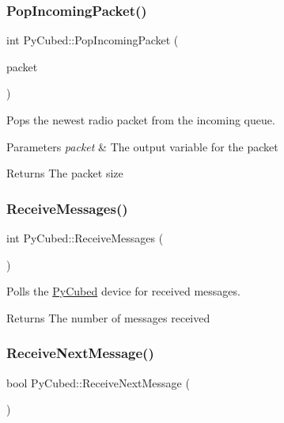 \subsubsection{\texorpdfstring{Pop\+Incoming\+Packet()}{PopIncomingPacket()}}
{\footnotesize\ttfamily int Py\+Cubed\+::\+Pop\+Incoming\+Packet (\begin{DoxyParamCaption}\item[{\hyperlink{structcubesat_1_1PyCubedPacket}{Py\+Cubed\+Packet} \&}]{packet }\end{DoxyParamCaption})}



Pops the newest radio packet from the incoming queue. 


\begin{DoxyParams}{Parameters}
{\em packet} & The output variable for the packet \\
\hline
\end{DoxyParams}
\begin{DoxyReturn}{Returns}
The packet size 
\end{DoxyReturn}
\mbox{\label{classcubesat_1_1PyCubed_a1f9dcecafbef5dc0b285aa34c7e6a81c}} 
\subsubsection{\texorpdfstring{Receive\+Messages()}{ReceiveMessages()}}
{\footnotesize\ttfamily int Py\+Cubed\+::\+Receive\+Messages (\begin{DoxyParamCaption}{ }\end{DoxyParamCaption})}



Polls the \hyperlink{classcubesat_1_1PyCubed}{Py\+Cubed} device for received messages. 

\begin{DoxyReturn}{Returns}
The number of messages received 
\end{DoxyReturn}
\mbox{\label{classcubesat_1_1PyCubed_a1a112a9d5f28f5a5cf1be27cd12d3cda}} 
\subsubsection{\texorpdfstring{Receive\+Next\+Message()}{ReceiveNextMessage()}}
{\footnotesize\ttfamily bool Py\+Cubed\+::\+Receive\+Next\+Message (\begin{DoxyParamCaption}{ }\end{DoxyParamCaption})}



